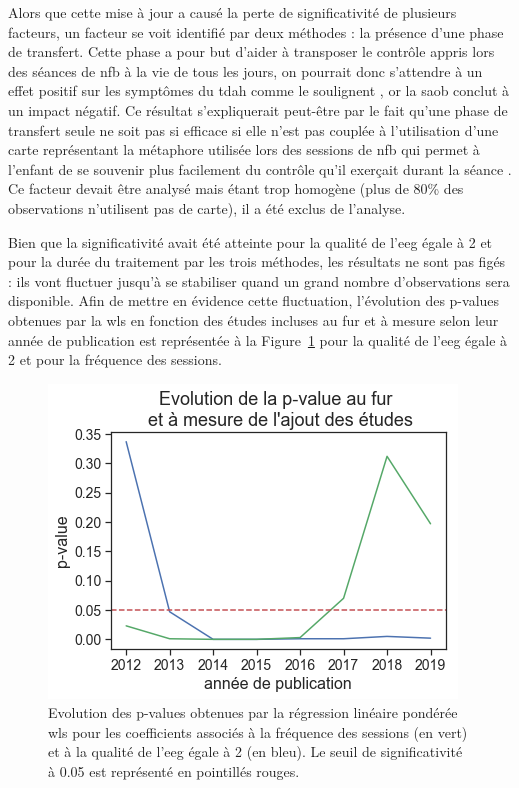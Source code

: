 Alors que cette mise à jour a causé la perte de significativité de plusieurs facteurs, un facteur se voit identifié par deux méthodes : la présence d'une phase de transfert. 
Cette phase a pour but d'aider à transposer le contrôle appris lors des séances de \gls{nfb} à la vie de tous les jours, on pourrait donc s'attendre à un effet positif sur les symptômes
du \gls{tdah} comme le soulignent \citet{Arns2014, Strehl2006, Gani2008}, or la \gls{saob} conclut à un impact négatif. Ce résultat s'expliquerait peut-être par le fait qu'une phase de 
transfert seule ne soit pas si efficace si elle n'est pas couplée à l'utilisation d'une carte représentant la métaphore utilisée lors des sessions de \gls{nfb} qui permet à l'enfant de se 
souvenir plus facilement du contrôle qu'il exerçait durant la séance \citep{Bioulac2019, Bluschke2016}. Ce facteur devait être analysé mais étant trop homogène (plus de 80\% des observations n'utilisent pas de carte), il 
a été exclus de l'analyse. 

Bien que la significativité avait été atteinte pour la qualité de l'\gls{eeg} égale à 2 et pour la durée du traitement par les trois méthodes, 
les résultats ne sont pas figés : ils vont fluctuer jusqu'à se stabiliser quand un grand nombre d'observations sera disponible. Afin de mettre en évidence cette fluctuation, l'évolution 
des p-values obtenues par la \gls{wls} en fonction des études incluses au fur et à mesure selon leur année de publication est représentée à la Figure~\ref{Figure:factors_evolution_pvalue} 
pour la qualité de l'\gls{eeg} égale à 2 et pour la fréquence des sessions.

\begin{figure}[h!]
  \centering
	\includegraphics[width=0.7\linewidth]{figures/chapter-3/factors-pvalue-evolution} 
  \caption{Evolution des p-values obtenues par la régression linéaire pondérée \gls{wls} pour les coefficients associés à la fréquence des sessions (en vert) et 
	à la qualité de l'\gls{eeg} égale à 2 (en bleu). Le seuil de significativité à 0.05 est représenté en pointillés rouges.}
  \label{Figure:factors_evolution_pvalue}
\end{figure}

